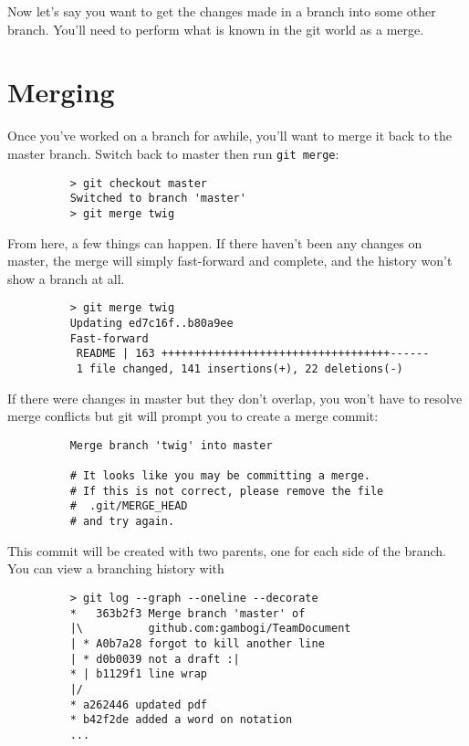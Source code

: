 \documentclass[11pt]{report}
\begin{document}
Now let's say you want to get the changes made in a branch into some other
branch. You'll need to perform what is known in the git world as a
merge.

\section{Merging}

Once you've worked on a branch for awhile, you'll want to merge it
back to the master branch. Switch back to master then run
\texttt{git merge}:

\begin{figure}[H]
  \begin{lstlisting}
    > git checkout master
    Switched to branch 'master'
    > git merge twig
  \end{lstlisting}
\end{figure}

From here, a few things can happen. If there haven't been any changes
on master, the merge will simply fast-forward and complete, and the
history won't show a branch at all.

\begin{figure}[H]
  \begin{lstlisting}
    > git merge twig
    Updating ed7c16f..b80a9ee
    Fast-forward
     README | 163 +++++++++++++++++++++++++++++++++++------
     1 file changed, 141 insertions(+), 22 deletions(-)
  \end{lstlisting}
\end{figure}

If there were changes in master but they don't overlap, you won't have
to resolve merge conflicts but git will prompt you to create a merge
commit:

\begin{figure}[H]
  \begin{lstlisting}
    Merge branch 'twig' into master
    
    # It looks like you may be committing a merge.
    # If this is not correct, please remove the file
    #  .git/MERGE_HEAD
    # and try again.
  \end{lstlisting}
\end{figure}

This commit will be created with two parents, one for each side of the
branch. You can view a branching history with

\begin{figure}[H]
  \begin{lstlisting}
    > git log --graph --oneline --decorate
    *   363b2f3 Merge branch 'master' of
    |\          github.com:gambogi/TeamDocument
    | * A0b7a28 forgot to kill another line
    | * d0b0039 not a draft :|
    * | b1129f1 line wrap
    |/  
    * a262446 updated pdf
    * b42f2de added a word on notation
    ...
  \end{lstlisting}
\end{figure}
\end{document}
